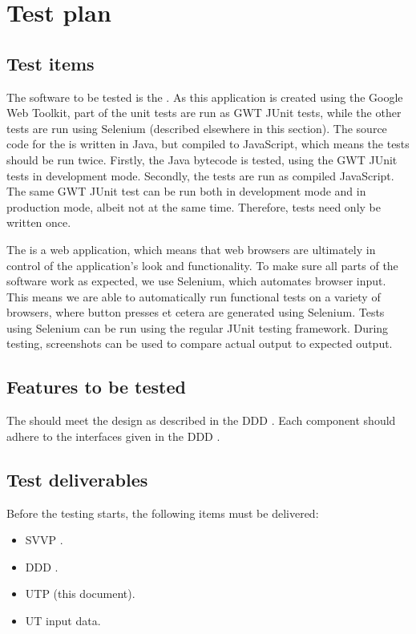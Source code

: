 \chapter{Test plan}

\section{Test items}
The software to be tested is the \applicationname{}. As this application is created using the Google Web Toolkit, part of the unit tests are run as GWT JUnit tests, while the other tests are run using Selenium (described elsewhere in this section). The source code for the \applicationname{} is written in Java, but compiled to JavaScript, which means the tests should be run twice. Firstly, the Java bytecode is tested, using the GWT JUnit tests in development mode. Secondly, the tests are run as compiled JavaScript. The same GWT JUnit test can be run both in development mode and in production mode, albeit not at the same time. Therefore, tests need only be written once.

The \applicationname{} is a web application, which means that web browsers are ultimately in control of the application's look and functionality. To make sure all parts of the software work as expected, we use Selenium, which automates browser input. This means we are able to automatically run functional tests on a variety of browsers, where button presses et cetera are generated using Selenium. Tests using Selenium can be run using the regular JUnit testing framework. During testing, screenshots can be used to compare actual output to expected output.

\section{Features to be tested}
The \applicationname{} should meet the design as described in the DDD \cite{ddd}. Each component should adhere to the interfaces given in the DDD \cite{ddd}.

\section{Test deliverables}
Before the testing starts, the following items must be delivered:

\begin{itemize}
  \item SVVP \cite{svvp}.
  \item DDD \cite{ddd}.
  \item UTP (this document).
  \item UT input data.
\end{itemize}

